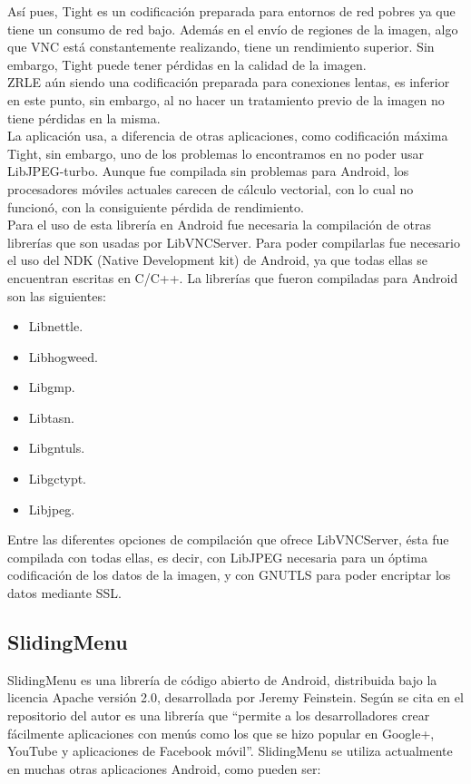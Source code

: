Así pues, Tight es un codificación preparada para entornos de red pobres ya que tiene un consumo de red bajo. Además en el envío de regiones de la imagen, algo que VNC está constantemente realizando, tiene un rendimiento superior. Sin embargo, Tight puede tener pérdidas en la calidad de la imagen.\\

ZRLE aún siendo una codificación preparada para conexiones lentas, es inferior en este punto, sin embargo, al no hacer un tratamiento previo de la imagen no tiene pérdidas en la misma.\\

La aplicación usa, a diferencia de otras aplicaciones, como codificación máxima Tight, sin embargo, uno de los problemas lo encontramos en no poder usar LibJPEG-turbo. Aunque fue compilada sin problemas para Android, los procesadores móviles actuales carecen de cálculo vectorial, con lo cual no funcionó, con la consiguiente pérdida de rendimiento.\\

Para el uso de esta librería en Android fue necesaria la compilación de otras librerías que son usadas por LibVNCServer. Para poder compilarlas fue necesario el uso del NDK (Native Development kit) de Android, ya que todas ellas se encuentran escritas en C/C++. La librerías que fueron compiladas para Android son las siguientes:
\begin{itemize}
\item Libnettle.
\item Libhogweed.
\item Libgmp.
\item Libtasn.
\item Libgntuls.
\item Libgctypt.
\item Libjpeg.
\end{itemize}

Entre las diferentes opciones de compilación que ofrece LibVNCServer, ésta fue compilada con todas ellas, es decir, con LibJPEG necesaria para un óptima codificación de los datos de la imagen, y con GNUTLS para poder encriptar los datos mediante SSL.

\subsection{SlidingMenu}

SlidingMenu\cite{slide:slide} es una librería de código abierto de Android, distribuida bajo la licencia Apache versión 2.0, desarrollada por Jeremy Feinstein. Según se cita en el repositorio del autor es una librería que “permite a los desarrolladores crear fácilmente aplicaciones con menús como los que se hizo popular en Google+, YouTube y aplicaciones de Facebook móvil”.\cite{slide:slide}
SlidingMenu se utiliza actualmente en muchas otras aplicaciones Android, como pueden ser: \\


